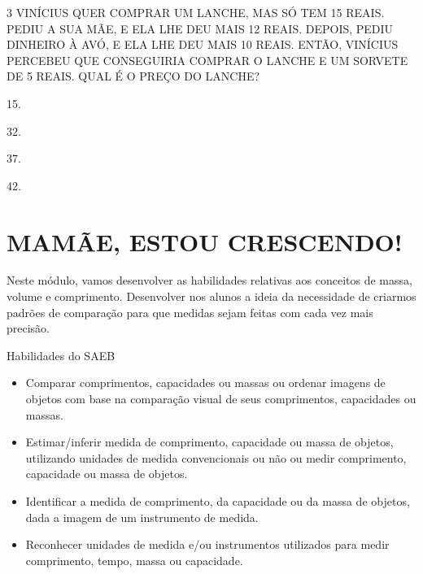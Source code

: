 

\num{3} VINÍCIUS QUER COMPRAR UM LANCHE, MAS SÓ TEM 15 REAIS. PEDIU A SUA MÃE, E
ELA LHE DEU MAIS 12 REAIS. DEPOIS, PEDIU DINHEIRO À AVÓ, E ELA
LHE DEU MAIS 10 REAIS. ENTÃO, VINÍCIUS PERCEBEU QUE CONSEGUIRIA COMPRAR O LANCHE E UM SORVETE DE 5 REAIS. QUAL É O PREÇO DO LANCHE?

\begin{escolha}
\item
  15.
\item
  32.
\item
  37.
\item
  42.
\end{escolha}


\chapter{MAMÃE, ESTOU CRESCENDO!}

Neste módulo, vamos desenvolver as habilidades relativas
aos conceitos de massa, volume e comprimento. Desenvolver nos alunos a
ideia da necessidade de criarmos padrões de comparação para que medidas
sejam feitas com cada vez mais precisão.

Habilidades do SAEB

\begin{itemize}
\item
  Comparar comprimentos, capacidades ou massas ou ordenar imagens de
  objetos com base na comparação visual de seus comprimentos,
  capacidades ou massas.
\item
  Estimar/inferir medida de comprimento, capacidade ou massa de objetos,
  utilizando unidades de medida convencionais ou não ou medir
  comprimento, capacidade ou massa de objetos.
\item
  Identificar a medida de comprimento, da capacidade ou da massa de
  objetos, dada a imagem de um instrumento de medida.
\item
  Reconhecer unidades de medida e/ou instrumentos utilizados para medir
  comprimento, tempo, massa ou capacidade.
\end{itemize}

